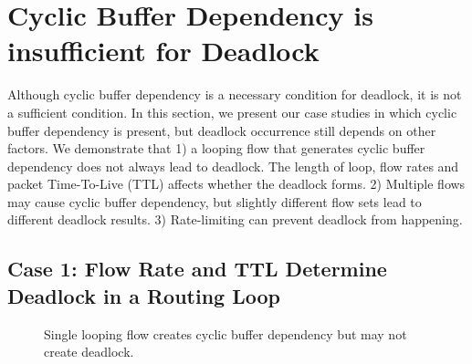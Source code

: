 \section{Cyclic Buffer Dependency is insufficient for Deadlock}
\label{sec:analysis}

Although cyclic buffer dependency is a necessary condition for deadlock, it is not a
sufficient condition. In this section, we present our case studies in which cyclic 
buffer dependency is present, but deadlock occurrence still depends on other factors. We demonstrate 
that 1) a looping flow that generates cyclic buffer dependency does not always lead to deadlock. 
The length of loop, flow rates and packet Time-To-Live (TTL) affects whether 
the deadlock forms. 2) Multiple flows may cause cyclic buffer dependency,
but slightly different flow sets lead to different deadlock results. 3) Rate-limiting can
prevent deadlock from happening.

\subsection{Case 1: Flow Rate and TTL Determine Deadlock in a Routing Loop}

\begin{figure}[t]
\centering
{}
\caption{Single looping flow creates cyclic buffer dependency but may not create deadlock.}
\label{fig:loop}
\end{figure}


